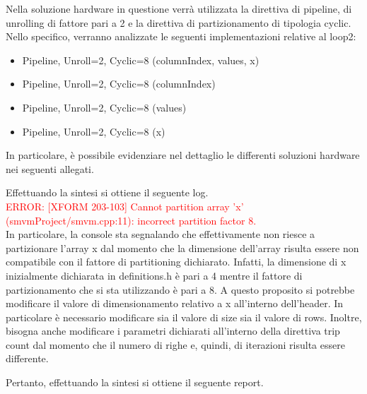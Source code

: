 Nella soluzione hardware in questione verrà utilizzata la direttiva di pipeline, di unrolling di fattore pari a 2 e la direttiva di partizionamento di tipologia cyclic. Nello specifico, verranno analizzate le seguenti implementazioni relative al loop2:
\begin{itemize}
	\item Pipeline, Unroll=2, Cyclic=8 (columnIndex, values, x)
	\item Pipeline, Unroll=2, Cyclic=8 (columnIndex)
	\item Pipeline, Unroll=2, Cyclic=8 (values)
	\item Pipeline, Unroll=2, Cyclic=8 (x)
\end{itemize}

In particolare, è possibile evidenziare nel dettaglio le differenti soluzioni hardware nei seguenti allegati.





Effettuando la sintesi si ottiene il seguente log.
\\
\textcolor{red}{ERROR: [XFORM 203-103] Cannot partition array 'x' (smvmProject/smvm.cpp:11): incorrect partition factor 8.}
\\
In particolare, la console sta segnalando che effettivamente non riesce a partizionare l'array x dal momento che la dimensione dell'array risulta essere non compatibile con il fattore di partitioning dichiarato. Infatti, la dimensione di x inizialmente dichiarata in definitions.h è pari a 4 mentre il fattore di partizionamento che si sta utilizzando è pari a 8. A questo proposito si potrebbe modificare il valore di dimensionamento relativo a x all'interno dell'header. In particolare è necessario modificare sia il valore di size sia il valore di rows. Inoltre, bisogna anche modificare i parametri dichiarati all'interno della direttiva trip count dal momento che il numero di righe e, quindi, di iterazioni risulta essere differente.






Pertanto, effettuando la sintesi si ottiene il seguente report.

